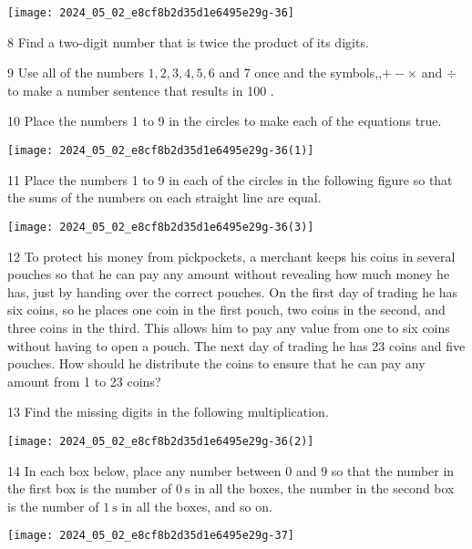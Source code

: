 \documentclass[10pt]{article}
\begin{document}
\begin{center}
\texttt{[image: 2024\_05\_02\_e8cf8b2d35d1e6495e29g-36]}
\end{center}

8 Find a two-digit number that is twice the product of its digits.

9 Use all of the numbers \(1,2,3,4,5,6\) and 7 once and the symbols,,\(+- \times\) and \(\div\) to make a number sentence that results in 100 .

10 Place the numbers 1 to 9 in the circles to make each of the equations true.

\begin{center}
\texttt{[image: 2024\_05\_02\_e8cf8b2d35d1e6495e29g-36(1)]}
\end{center}

11 Place the numbers 1 to 9 in each of the circles in the following figure so that the sums of the numbers on each straight line are equal.

\begin{center}
\texttt{[image: 2024\_05\_02\_e8cf8b2d35d1e6495e29g-36(3)]}
\end{center}

12 To protect his money from pickpockets, a merchant keeps his coins in several pouches so that he can pay any amount without revealing how much money he has, just by handing over the correct pouches. On the first day of trading he has six coins, so he places one coin in the first pouch, two coins in the second, and three coins in the third. This allows him to pay any value from one to six coins without having to open a pouch. The next day of trading he has 23 coins and five pouches. How should he distribute the coins to ensure that he can pay any amount from 1 to 23 coins?

13 Find the missing digits in the following multiplication.

\begin{center}
\texttt{[image: 2024\_05\_02\_e8cf8b2d35d1e6495e29g-36(2)]}
\end{center}

14 In each box below, place any number between 0 and 9 so that the number in the first box is the number of \(0 \mathrm{~s}\) in all the boxes, the number in the second box is the number of \(1 \mathrm{~s}\) in all the boxes, and so on.

\begin{center}
\texttt{[image: 2024\_05\_02\_e8cf8b2d35d1e6495e29g-37]}
\end{center}
\end{document}
